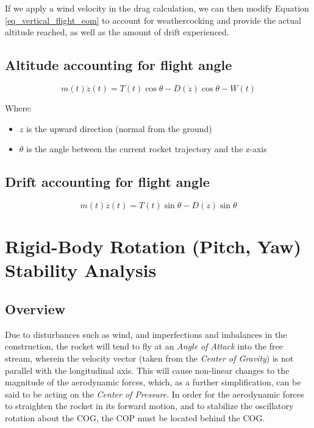 \documentclass[]{book}
\providecommand{\tightlist}{%
  \setlength{\itemsep}{0pt}\setlength{\parskip}{0pt}}
\begin{document}
If we apply a wind velocity in the drag calculation, we can then modify
Equation \ref{eq_vertical_flight_eom} to account for weathercocking and
provide the actual altitude reached, as well as the amount of drift
experienced.

\section{Altitude accounting for flight
angle}\label{altitude-accounting-for-flight-angle}

\begin{equation}
\label{eq_vertical_angle}
m(t)\ddot{z}(t) = T(t) \cos \theta - D(\dot{z}) \cos \theta - W(t)
\end{equation}

Where:

\begin{itemize}
\tightlist
\item
  \(z\) is the upward direction (normal from the ground)
\item
  \(\theta\) is the angle between the current rocket trajectory and the
  z-axis
\end{itemize}

\section{Drift accounting for flight
angle}\label{drift-accounting-for-flight-angle}

\begin{equation}
\label{eq_vertical_angle}
m(t) \ddot{z}(t) = T(t) \sin \theta - D(\dot{z}) \sin \theta 
\end{equation}

\chapter{Rigid-Body Rotation (Pitch, Yaw) Stability
Analysis}\label{rigid-body-rotation-pitch-yaw-stability-analysis}

\section{Overview}\label{overview-2}

Due to disturbances such as wind, and imperfections and imbalances in
the construction, the rocket will tend to fly at an \emph{Angle of
Attack} into the free stream, wherein the velocity vector (taken from
the \emph{Center of Gravity}) is not parallel with the longitudinal
axis. This will cause non-linear changes to the magnitude of the
aerodynamic forces, which, as a further simplification, can be said to
be acting on the \emph{Center of Pressure}. In order for the aerodynamic
forces to straighten the rocket in its forward motion, and to stabilize
the oscillatory rotation about the COG, the COP must be located behind
the COG.
\end{document}

